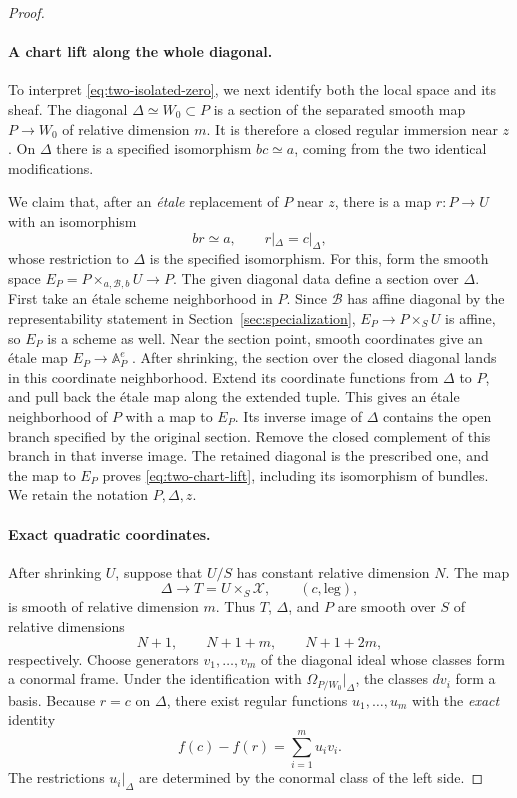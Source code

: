 \begin{proof}
\paragraph{A chart lift along the whole diagonal.}
To interpret \eqref{eq:two-isolated-zero}, we next identify both
the local space and its sheaf. The diagonal
$\Delta\simeq W_0\subset P$ is a section of the separated smooth
map $P\to W_0$ of relative dimension $m$.
It is therefore a closed regular immersion near $z$.
On $\Delta$ there is a specified isomorphism $bc\simeq a$,
coming from the two identical modifications.

We claim that, after an \emph{étale} replacement of $P$ near $z$,
there is a map $r:P\to U$ with an isomorphism
\begin{equation}
 \label{eq:two-chart-lift}
 br\simeq a,
 \qquad r|_\Delta=c|_\Delta,
\end{equation}
whose restriction to $\Delta$ is the specified isomorphism.
For this, form the smooth space
$E_P=P\times_{a,\mathcal B,b}U\to P$.
The given diagonal data define a section over $\Delta$.
First take an étale scheme neighborhood in $P$.
Since $\mathcal B$ has affine diagonal by the representability
statement in Section~\ref{sec:specialization}, $E_P\to P\times_S U$
is affine, so $E_P$ is a scheme as well.
Near the section point, smooth coordinates give an étale map
$E_P\to\mathbb A_P^e$
\cite[Tag~039P]{Stacks}.
After shrinking, the section over the closed diagonal lands in
this coordinate neighborhood. Extend its coordinate functions
from $\Delta$ to $P$, and pull back the étale map along the
extended tuple. This gives an étale neighborhood of $P$ with
a map to $E_P$. Its inverse image of $\Delta$ contains the
open branch specified by the original section.
Remove the closed complement of this branch in that inverse
image. The retained diagonal is the prescribed one, and the
map to $E_P$ proves \eqref{eq:two-chart-lift}, including its
isomorphism of bundles. We retain the notation $P,\Delta,z$.

\paragraph{Exact quadratic coordinates.}
After shrinking $U$, suppose that $U/S$ has constant relative
dimension $N$. The map
\[
 \Delta\longrightarrow T=U\times_S\mathscr X,
 \qquad (c,\text{leg}),
\]
is smooth of relative dimension $m$. Thus $T$, $\Delta$, and
$P$ are smooth over $S$ of relative dimensions
\[
 N+1,\qquad N+1+m,\qquad N+1+2m,
\]
respectively. Choose generators $v_1,\ldots,v_m$ of the
diagonal ideal whose classes form a conormal frame.
Under the identification with
$\Omega_{P/W_0}|_\Delta$, the classes $dv_i$ form a basis.
Because $r=c$ on $\Delta$, there exist regular functions
$u_1,\ldots,u_m$ with the \emph{exact} identity
\begin{equation}
 \label{eq:two-exact-quadratic}
 f(c)-f(r)=\sum_{i=1}^m u_i v_i.
\end{equation}
The restrictions $u_i|_\Delta$ are determined by the conormal
class of the left side.


\end{proof}

